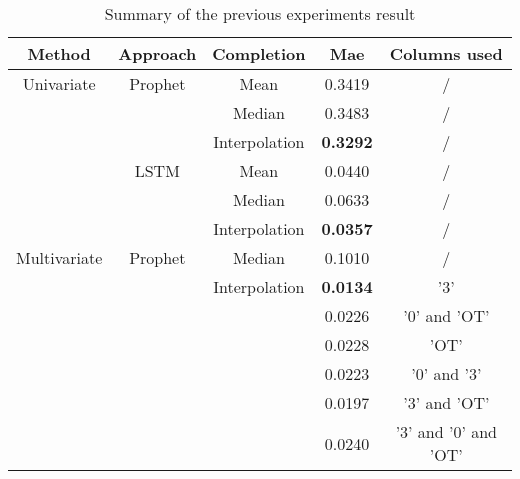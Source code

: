 \documentclass[10pt]{article}
\begin{document}
\begin{multicols}{2}
\end{multicols}


\begin{table}[H]
\centering
\begin{tabular}{|c|c|c|c|c|}
\hline
\textbf{Method} & \textbf{Approach} & \textbf{Completion} & \textbf{Mae} & \textbf{Columns used} \\
\hline
Univariate & Prophet & Mean & 0.3419 & / \\
\cline{3-5}
 &  & Median & 0.3483 & / \\
\cline{3-5}
 &  & Interpolation & \textbf{0.3292} & /  \\
\cline{2-5}
 & LSTM & Mean & 0.0440 & / \\
\cline{3-5}
 & & Median & 0.0633 & / \\
\cline{3-5}
 &  & Interpolation & \textbf{0.0357} & / \\
\hline

Multivariate & Prophet & Median & 0.1010 & / \\
\cline{3-5}
 &  & Interpolation & \textbf{0.0134} & '3' \\
 &  &  & 0.0226 & '0' and 'OT' \\
 &  &  & 0.0228 & 'OT' \\
 &  &  & 0.0223 & '0' and '3' \\
 &  &  & 0.0197 & '3' and 'OT' \\
 &  &  & 0.0240 & '3' and '0' and 'OT' \\
\hline

\end{tabular}
\caption{Summary of the previous experiments result}
\label{t1}
\end{table}
\end{document}
